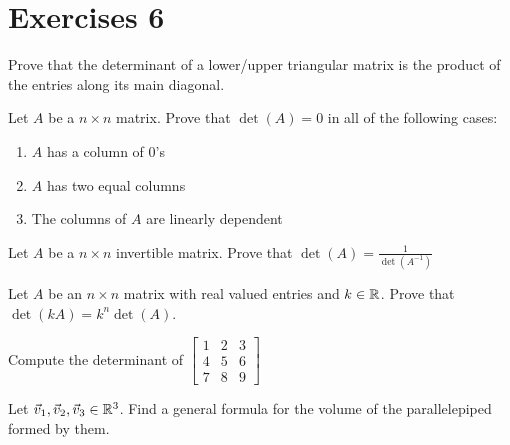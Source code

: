 \section{Exercises 6}
\begin{exercise}
    Prove that the determinant of a lower/upper triangular matrix is the product of the entries along its main diagonal.
\end{exercise}
\begin{exercise}
    Let $A$ be a $n\times n$ matrix. Prove that $\det(A)=0$ in all of the following cases:
    \begin{enumerate}
        \item $A$ has a column of $0$'s
        \item $A$ has two equal columns
        \item The columns of $A$ are linearly dependent
    \end{enumerate}
\end{exercise}
\begin{exercise}
    Let $A$ be a $n\times n$ invertible matrix. Prove that $\det(A)=\frac{1}{\det(A^{-1})}$
\end{exercise}
\begin{exercise}
    Let $A$ be an $n\times n$ matrix with real valued entries and $k\in\mathbb{R}$. Prove that $\det(kA)=k^n\det(A)$.
\end{exercise}
\begin{exercise}
    Compute the determinant of
    $\begin{bmatrix}
        1 & 2 & 3\\
        4 & 5 & 6\\
        7 & 8 & 9
    \end{bmatrix}$
\end{exercise}
\begin{exercise}
    Let $\vec{v}_1,\vec{v}_2,\vec{v}_3\in\mathbb{R}^3$. Find a general formula for the volume of the parallelepiped formed by them.
\end{exercise}